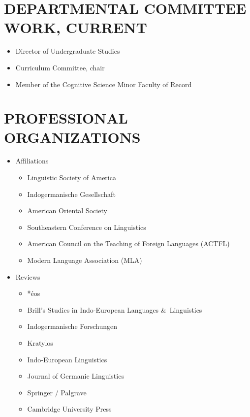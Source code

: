 \documentclass[paper=letter,fontsize=11pt]{scrartcl} %
\newcommand{\NewPart}[2]{\section*{\uppercase{#1} #2}}
\begin{document}
\NewPart{Departmental Committee Work, current}{}
\begin{itemize}
\item Director of Undergraduate Studies
\item Curriculum Committee, chair
\item Member of the Cognitive Science Minor Faculty of Record
\end{itemize}

\NewPart{Professional organizations}{}
\begin{itemize}
\item Affiliations
\begin{itemize}
    \item Linguistic Society of America
    \item Indogermanische Gesellschaft
    \item American Oriental Society
    \item Southeastern Conference on Linguistics
    \item American Council on the Teaching of Foreign Languages (ACTFL)
    \item Modern Language Association (MLA)
\end{itemize}
\item Reviews
\begin{itemize}
    \item *\'{e}os
    \item Brill’s Studies in Indo-European Languages \&~Linguistics 
    \item Indogermanische Forschungen
    \item Kratylos
    \item Indo-European Linguistics
    \item Journal of Germanic Linguistics
    \item Springer / Palgrave
    \item Cambridge University Press
\end{itemize}
\end{itemize}
\end{document}
